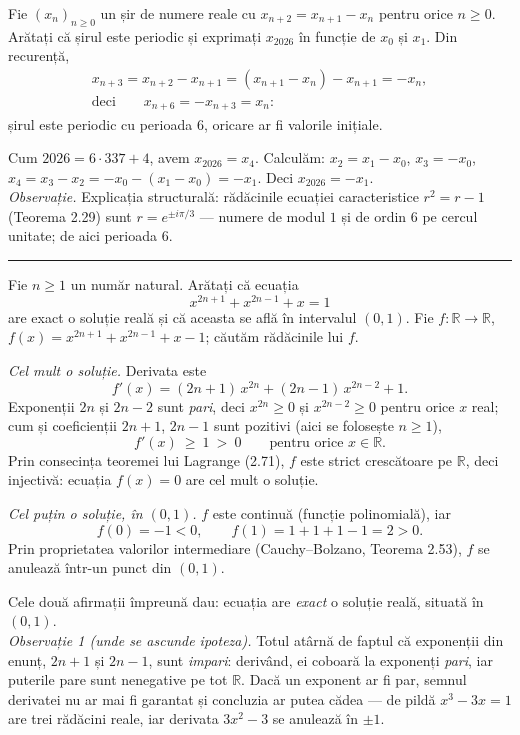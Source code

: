 Fie $(x_n)_{n\ge0}$ un șir de numere reale cu $x_{n+2}=x_{n+1}-x_n$ pentru orice $n\ge0$. Arătați că șirul este periodic și exprimați $x_{2026}$ în funcție de $x_0$ și $x_1$.
\sol Din recurență,
\[ \begin{gathered} x_{n+3}=x_{n+2}-x_{n+1}=(x_{n+1}-x_n)-x_{n+1}=-x_n,\\ \text{deci}\qquad x_{n+6}=-x_{n+3}=x_n : \end{gathered} \]
șirul este periodic cu perioada $6$, oricare ar fi valorile inițiale.

Cum $2026=6\cdot337+4$, avem $x_{2026}=x_4$. Calculăm: $x_2=x_1-x_0$, $x_3=-x_0$, $x_4=x_3-x_2=-x_0-(x_1-x_0)=-x_1$. Deci $x_{2026}=-x_1$.\\[2pt]
\emph{Observație.} Explicația structurală: rădăcinile ecuației caracteristice $r^2=r-1$ (Teorema 2.29) sunt $r=e^{\pm i\pi/3}$ --- numere de modul $1$ și de ordin $6$ pe cercul unitate; de aici perioada $6$.
\vspace{1mm}\hrule

Fie $n\ge1$ un număr natural. Arătați că ecuația
\[ x^{2n+1}+x^{2n-1}+x=1 \]
are exact o soluție reală și că aceasta se află în intervalul $(0,1)$.
\sol Fie $f:\mathbb{R}\to\mathbb{R}$, $f(x)=x^{2n+1}+x^{2n-1}+x-1$; căutăm rădăcinile lui $f$.

\emph{Cel mult o soluție.} Derivata este
\[ f'(x)=(2n+1)\,x^{2n}+(2n-1)\,x^{2n-2}+1 . \]
Exponenții $2n$ și $2n-2$ sunt \emph{pari}, deci $x^{2n}\ge0$ și $x^{2n-2}\ge0$ pentru orice $x$ real; cum și coeficienții $2n+1$, $2n-1$ sunt pozitivi (aici se folosește $n\ge1$),
\[ f'(x)\ \ge\ 1\ >\ 0\qquad\text{pentru orice }x\in\mathbb{R} . \]
Prin consecința teoremei lui Lagrange (2.71), $f$ este strict crescătoare pe $\mathbb{R}$, deci injectivă: ecuația $f(x)=0$ are cel mult o soluție.

\emph{Cel puțin o soluție, în $(0,1)$.} $f$ este continuă (funcție polinomială), iar
\[ f(0)=-1<0,\qquad f(1)=1+1+1-1=2>0 . \]
Prin proprietatea valorilor intermediare (Cauchy--Bolzano, Teorema 2.53), $f$ se anulează într-un punct din $(0,1)$.

Cele două afirmații împreună dau: ecuația are \emph{exact} o soluție reală, situată în $(0,1)$.\\[2pt]
\emph{Observație 1 (unde se ascunde ipoteza).} Totul atârnă de faptul că exponenții din enunț, $2n+1$ și $2n-1$, sunt \emph{impari}: derivând, ei coboară la exponenți \emph{pari}, iar puterile pare sunt nenegative pe tot $\mathbb{R}$. Dacă un exponent ar fi par, semnul derivatei nu ar mai fi garantat și concluzia ar putea cădea --- de pildă $x^3-3x=1$ are trei rădăcini reale, iar derivata $3x^2-3$ se anulează în $\pm1$.

